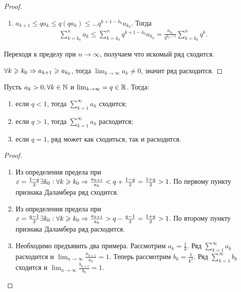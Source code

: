 \documentclass[../main.tex]{subfiles}
\begin{document}
\begin{proof}
  \begin{enumerate}
    \item $a_{k+1} \leq qa_k \leq q (qa_k ) \leq ... q^{k+1-k_0}a_{k_0 }$. Тогда 
    \begin{gather} 
      \sum_{k=k_0 }^{n} a_k \leq \sum_{k=k_0 }^{n} q^{k+1-k_0 } a_{k_0 } = \frac{a_{k_0 }}{q^{k_0 -1}} \sum_{k=k_0 }^{n} q^{k}  .
    \end{gather} 
  \end{enumerate}
  Переходя к пределу при $n \to \infty$, получаем что искомый ряд сходится.
  \item $\forall k \geqslant k_0 \Rightarrow a_{k+1} \geqslant a_{k_0 }$, тогда $\lim_{k \to \infty} a_k \neq 0$, значит ряд расходится.  
\end{proof}


\begin{corollary}
  Пусть $a_k > 0, \forall k \in \mathbb{N}$ и $\lim_{k \to \infty} = q \in \mathbb{R}$. Тогда:
  \begin{enumerate}
    \item если $q < 1$, тогда $ \sum_{k=1}^{\infty} a_k$ сходится;
    \item если $q > 1$, тогда $ \sum_{k=1}^{\infty} a_k$ расходится;
    \item если $q = 1$, ряд может как сходиться, так и расходится. 
  \end{enumerate}  
\end{corollary}


\begin{proof}
  \begin{enumerate}
    \item Из определения предела при $\varepsilon = \frac{1-q}{2} \exists k_0 : \forall k \geqslant k_0 \Rightarrow \frac{a_{k+1}}{a_k } < q + \frac{1-q}{2} = \frac{1+q}{2} > 1$. По первому пункту признака Даламбера ряд сходится.
    \item Из определения предела при $\varepsilon = \frac{q-1}{2} \exists k_0 : \forall k \geqslant k_0 \Rightarrow \frac{a_{k+1}}{a_k } > q - \frac{q-1}{2} = \frac{1+q}{2} > 1$. По второму пункту признака Даламбера ряд расходится.
    \item Необходимо предъявить два примера. Рассмотрим $a_k = \frac{1}{k}$. Ряд $ \sum_{k=1}^{\infty} a_k $ расходится и $ \lim_{n \to \infty} \frac{a_{k+1}}{a_k } = 1$. Теперь рассмотрим $b_k = \frac{1}{k^{2}}$. Ряд $ \sum_{k=1}^{\infty} b_k  $ сходится и $ \lim_{n \to \infty} \frac{b_{k+1}}{b_k } = 1$.  
  \end{enumerate}
\end{proof}
\end{document}
